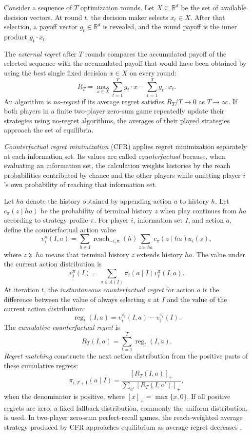 Consider a sequence of $T$ optimization rounds. Let $X\subseteq\mathbb{R}^d$ be the set of available decision vectors. At round $t$, the decision maker selects $x_t\in X$. After that selection, a payoff vector $g_t\in\mathbb{R}^d$ is revealed, and the round payoff is the inner product $g_t\cdot x_t$.

The \emph{external regret} after $T$ rounds compares the accumulated payoff of the selected sequence with the accumulated payoff that would have been obtained by using the best single fixed decision $x\in X$ on every round:
\[
    R_T
    =
    \max_{x\in X}
    \sum_{t=1}^T g_t\cdot x
    -
    \sum_{t=1}^T g_t\cdot x_t.
\]
An algorithm is \emph{no-regret} if its average regret satisfies $R_T/T\to0$ as $T\to\infty$. If both players in a finite two-player zero-sum game repeatedly update their strategies using no-regret algorithms, the averages of their played strategies approach the set of equilibria.

\emph{Counterfactual regret minimization} (CFR) applies regret minimization separately at each information set. Its values are called \emph{counterfactual} because, when evaluating an information set, the calculation weights histories by the reach probabilities contributed by chance and the other players while omitting player $i$'s own probability of reaching that information set.

Let $ha$ denote the history obtained by appending action $a$ to history $h$. Let $c_\pi(z\mid ha)$ be the probability of terminal history $z$ when play continues from $ha$ according to strategy profile $\pi$. For player $i$, information set $I$, and action $a$, define the counterfactual action value
\[
    v_i^\pi(I,a)
    =
    \sum_{h\in I}
    \operatorname{reach}_{-i,\pi}(h)
    \sum_{z\succeq ha}
    c_\pi(z\mid ha)u_i(z),
\]
where $z\succeq ha$ means that terminal history $z$ extends history $ha$. The value under the current action distribution is
\[
    v_i^\pi(I)
    =
    \sum_{a\in A(I)}
    \pi_i(a\mid I)v_i^\pi(I,a).
\]
At iteration $t$, the \emph{instantaneous counterfactual regret} for action $a$ is the difference between the value of always selecting $a$ at $I$ and the value of the current action distribution:
\[
    \operatorname{reg}_t(I,a)
    =
    v_i^{\pi_t}(I,a)-v_i^{\pi_t}(I).
\]
The \emph{cumulative counterfactual regret} is
\[
    R_T(I,a)=\sum_{t=1}^T \operatorname{reg}_t(I,a).
\]
\emph{Regret matching} constructs the next action distribution from the positive parts of these cumulative regrets:
\[
    \pi_{i,T+1}(a\mid I)
    =
    \frac{[R_T(I,a)]_+}
         {\sum_{a'}[R_T(I,a')]_+},
\]
when the denominator is positive, where $[x]_+=\max\{x,0\}$. If all positive regrets are zero, a fixed fallback distribution, commonly the uniform distribution, is used. In two-player zero-sum perfect-recall games, the reach-weighted average strategy produced by CFR approaches equilibrium as average regret decreases \cite{zinkevich2007regret}.

